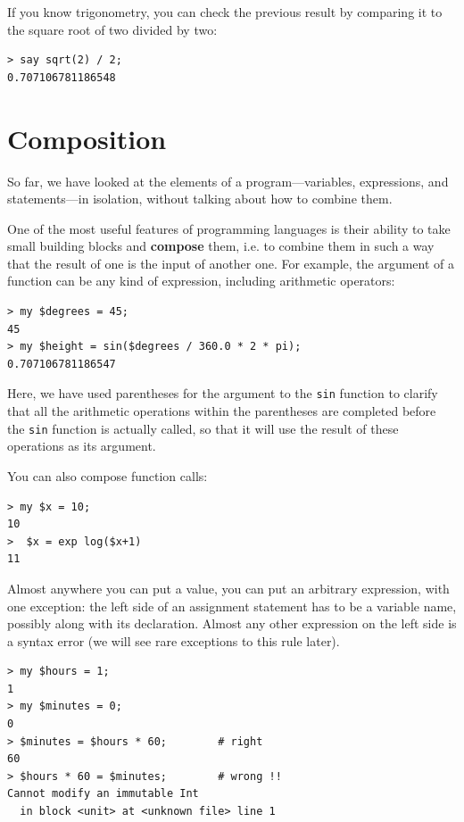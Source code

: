 If you know
trigonometry, you can check the previous result by comparing it to
the square root of two divided by two:

\begin{verbatim}
> say sqrt(2) / 2;
0.707106781186548
\end{verbatim}
%

\section{Composition}

So far, we have looked at the elements of a program---variables,
expressions, and statements---in isolation, without talking about how to combine them.

One of the most useful features of programming languages is their
ability to take small building blocks and {\bf compose} them, i.e. 
to combine them in such a way that the result of one is the 
input of another one.  For example, the argument of a function 
can be any kind of expression, including arithmetic operators:

\begin{verbatim}
> my $degrees = 45;
45
> my $height = sin($degrees / 360.0 * 2 * pi);
0.707106781186547
\end{verbatim}
%
Here, we have used parentheses for the argument to the {\tt sin} 
function to clarify that all the arithmetic operations 
within the parentheses are completed before the {\tt sin} function 
is actually called, so that it will use the result of these operations 
as its argument. 

You can also compose function calls:

\begin{verbatim}
> my $x = 10;
10
>  $x = exp log($x+1)
11
\end{verbatim}
%
Almost anywhere you can put a value, you can put an arbitrary
expression, with one exception: the left side of an assignment
statement has to be a variable name, possibly along with its
declaration.  Almost any other expression on the left
side is a syntax error (we will see rare exceptions to this rule
later).

\begin{verbatim}
> my $hours = 1;
1
> my $minutes = 0;
0
> $minutes = $hours * 60;        # right 
60
> $hours * 60 = $minutes;        # wrong !!
Cannot modify an immutable Int
  in block <unit> at <unknown file> line 1
\end{verbatim}
%


